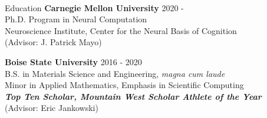 \documentclass{resume} %
\begin{document}
\begin{center}
{\Huge \href{https://github.com/kendranoneman}{\faGithub}}\hspace{3mm}
{\Huge \href{https://www.linkedin.com/in/kendranoneman/}{\faLinkedinSquare}} \hspace{3mm}
{\Huge \href{https://twitter.com/kendranoneman}{\faTwitter}} \hspace{3mm}
{\Huge \href{https://www.mayolab.net}{\faFlask}
}\\
\end{center}

\begin{rSection}{Education}
{\bf Carnegie Mellon University} \hfill {2020 -} \\ 
Ph.D. Program in Neural Computation \\
Neuroscience Institute, Center for the Neural Basis of Cognition \\
(Advisor: J. Patrick Mayo) \smallskip 

{\bf Boise State University} \hfill {2016 - 2020} \\ 
B.S. in Materials Science and Engineering, \textit{magna cum laude} \\
Minor in Applied Mathematics, Emphasis in Scientific Computing \\
{\bf \textit{Top Ten Scholar, Mountain West Scholar Athlete of the Year}} \\ 
(Advisor: Eric Jankowski) \smallskip

\end{rSection}

\end{document}
